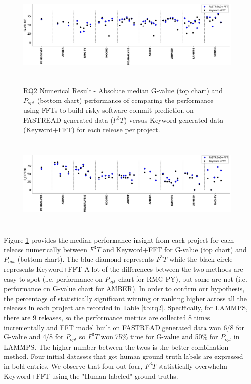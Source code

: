 \documentclass[sigconf,review, anonymous]{acmart}
\begin{document}
\begin{figure}[!t]
\small
\vspace{-10pt}
\caption{RQ2 Numerical Result - Absolute median G-value (top chart) and $P_{opt}$ (bottom chart) performance of comparing the performance using FFTs to build risky software commit prediction on FASTREAD generated data ($F^3T$) versus Keyword generated data (Keyword+FFT) for each release per project.}
\includegraphics[width=\linewidth, height=1.8in]{rq2_1.png}
\label{fig:rq2}
\vspace{-20pt}
\end{figure}
\begin{figure}[!t]
\small
\includegraphics[width=\linewidth, height=1.8in]{rq2_2.png}
\vspace{-20pt}
\end{figure}


 
 Figure \ref{fig:rq2} provides the median performance insight from each project for each release numerically between $F^3T$ and Keyword+FFT for G-value (top chart) and $P_{opt}$ (bottom chart). The blue diamond represents $F^3T$ while the black circle represents Keyword+FFT A lot of the differences between the two methods are easy to spot (i.e. performance on $P_{opt}$ chart for RMG-PY), but some are not (i.e. performance on G-value chart for AMBER). In order to confirm our hypothesis,
 the percentage of statistically significant winning or ranking higher across all the releases in each project are recorded in Table \ref{tb:rq2}. Specifically, for LAMMPS, there are 9 releases, so the performance metrics are collected 8 times incrementally and FFT model built on FASTREAD generated data won 6/8 for G-value and 4/8 for $P_{opt}$  so $F^3T$ won 75\% time for G-value and 50\% for $P_{opt}$ in LAMMPS. The higher number between the twos is the better combination method. Four initial datasets that got human ground truth labels are expressed in bold entries. We observe that four out four, $F^3T$ statistically overwhelm Keyword+FFT using the "Human labeled" ground truths.  
 
\end{document}

